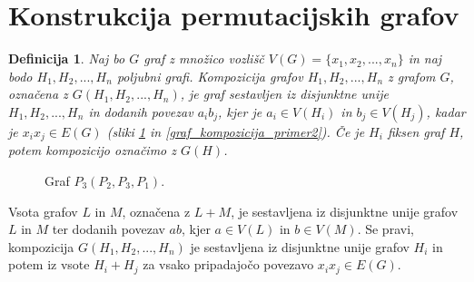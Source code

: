 \documentclass[a4paper, 12pt]{book}
\newtheorem{definicija}{Definicija}[chapter]
\begin{document}
\section{ Konstrukcija permutacijskih grafov}

\begin{definicija}
    Naj bo $G$ graf z množico vozlišč $V(G) = \{x_1, x_2, ..., x_n\}$ in naj bodo $H_1, H_2, ..., H_n$ poljubni grafi. Kompozicija grafov $H_1, H_2, ..., H_n$ z grafom $G$, označena z $G(H_1, H_2, ..., H_n)$, je graf sestavljen iz disjunktne unije $H_1, H_2, ..., H_n$ in dodanih povezav $a_ib_j$, kjer je $a_i \in V(H_i)$ in $b_j \in V(H_j)$, kadar je $x_ix_j \in E(G)$ (sliki \ref{graf_kompozicija_primer1} in \ref{graf_kompozicija_primer2}). Če je $H_i$ fiksen graf $H$, potem kompozicijo označimo z $G(H)$. 
\end{definicija}

\begin{figure}[h]
    \begin{center}        
    \end{center}
    \caption{Graf $P_3(P_2, P_3, P_1)$.}
    \label{graf_kompozicija_primer1}
\end{figure}

Vsota grafov $L$ in $M$, označena z $L + M$, je sestavljena iz disjunktne unije grafov $L$ in $M$ ter dodanih povezav $ab$, kjer $a \in V(L)$ in $b \in V(M)$. Se pravi, kompozicija $G(H_1, H_2, ..., H_n)$ je sestavljena iz disjunktne unije grafov $H_i$ in potem iz vsote $H_i + H_j$ za vsako pripadajočo povezavo $x_ix_j \in E(G)$.
\end{document}
